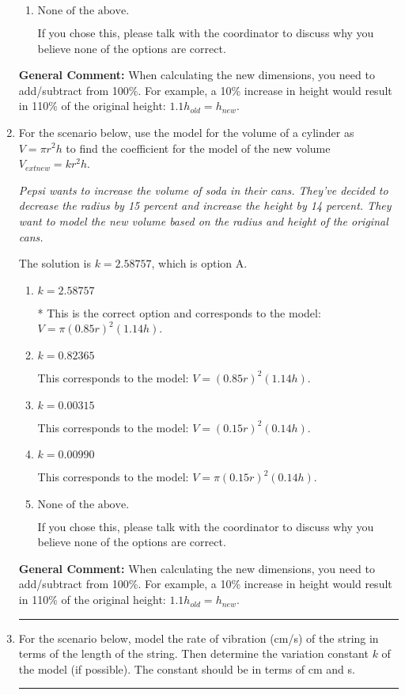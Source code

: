\documentclass{extbook}[14pt]
\newcommand{\litem}[1]{\item #1

\rule{\textwidth}{0.4pt}}
\begin{document}
\begin{enumerate}
{\begin{enumerate}[label=\Alph*.]
This corresponds to the model: $V = (1.12 r)^2 (1.14 h)$.
\item \( \text{None of the above.} \)

If you chose this, please talk with the coordinator to discuss why you believe none of the options are correct.
\end{enumerate}

\textbf{General Comment:} When calculating the new dimensions, you need to add/subtract from 100\%. For example, a 10\% increase in height would result in 110\% of the original height: $1.1h_{old} = h_{new}$.
}
\litem{
For the scenario below, use the model for the volume of a cylinder as $V = \pi r^2 h$ to find the coefficient for the model of the new volume $V_{	ext{new}} = k r^2 h$.

\begin{center}
    \textit{ Pepsi wants to increase the volume of soda in their cans. They've decided to decrease the radius by 15 percent and increase the height by 14 percent. They want to model the new volume based on the radius and height of the original cans. }
\end{center}
The solution is \( k = 2.58757 \), which is option A.\begin{enumerate}[label=\Alph*.]
\item \( k = 2.58757 \)

* This is the correct option and corresponds to the model: $V = \pi (0.85 r)^2 (1.14 h)$.
\item \( k = 0.82365 \)

This corresponds to the model: $V = (0.85 r)^2 (1.14 h)$.
\item \( k = 0.00315 \)

This corresponds to the model: $V = (0.15 r)^2 (0.14 h)$.
\item \( k = 0.00990 \)

This corresponds to the model: $V = \pi (0.15 r)^2 (0.14 h)$.
\item \( \text{None of the above.} \)

If you chose this, please talk with the coordinator to discuss why you believe none of the options are correct.
\end{enumerate}

\textbf{General Comment:} When calculating the new dimensions, you need to add/subtract from 100\%. For example, a 10\% increase in height would result in 110\% of the original height: $1.1h_{old} = h_{new}$.
}
\litem{
For the scenario below, model the rate of vibration (cm/s) of the string in terms of the length of the string. Then determine the variation constant $k$ of the model (if possible). The constant should be in terms of cm and s.

}
\end{enumerate}
\end{document}
